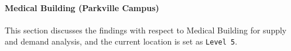     

\paragraph{Medical Building (Parkville Campus)}
This section discusses the findings with respect to Medical Building for supply and demand analysis, and the current location is set as \texttt{Level 5}.
